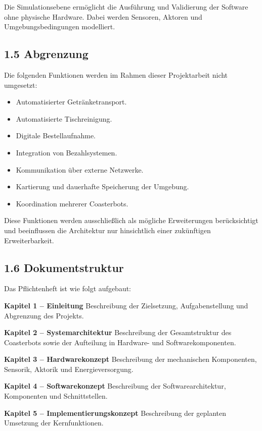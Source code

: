 \documentclass[
  a4paper,
  12pt,
  DIV=12,        %
  parskip=half,  %
  headings=small %
]{scrartcl}
\theoremstyle{definition}
\providecommand{\tightlist}{%
  \setlength{\itemsep}{0pt}\setlength{\parskip}{0pt}}
\theoremstyle{definition}
\providecommand{\tightlist}{%
  \setlength{\itemsep}{0pt}\setlength{\parskip}{0pt}}
\begin{document}
Die Simulationsebene ermöglicht die Ausführung und Validierung der
Software ohne physische Hardware. Dabei werden Sensoren, Aktoren und
Umgebungsbedingungen modelliert.

\subsection{1.5 Abgrenzung}\label{abgrenzung}

Die folgenden Funktionen werden im Rahmen dieser Projektarbeit nicht
umgesetzt:

\begin{itemize}
\tightlist
\item
  Automatisierter Getränketransport.
\item
  Automatisierte Tischreinigung.
\item
  Digitale Bestellaufnahme.
\item
  Integration von Bezahlsystemen.
\item
  Kommunikation über externe Netzwerke.
\item
  Kartierung und dauerhafte Speicherung der Umgebung.
\item
  Koordination mehrerer Coasterbots.
\end{itemize}

Diese Funktionen werden ausschließlich als mögliche Erweiterungen
berücksichtigt und beeinflussen die Architektur nur hinsichtlich einer
zukünftigen Erweiterbarkeit.

\subsection{1.6 Dokumentstruktur}\label{dokumentstruktur}

Das Pflichtenheft ist wie folgt aufgebaut:

\textbf{Kapitel 1 -- Einleitung} Beschreibung der Zielsetzung,
Aufgabenstellung und Abgrenzung des Projekts.

\textbf{Kapitel 2 -- Systemarchitektur} Beschreibung der Gesamtstruktur
des Coasterbots sowie der Aufteilung in Hardware- und
Softwarekomponenten.

\textbf{Kapitel 3 -- Hardwarekonzept} Beschreibung der mechanischen
Komponenten, Sensorik, Aktorik und Energieversorgung.

\textbf{Kapitel 4 -- Softwarekonzept} Beschreibung der
Softwarearchitektur, Komponenten und Schnittstellen.

\textbf{Kapitel 5 -- Implementierungskonzept} Beschreibung der geplanten
Umsetzung der Kernfunktionen.
\end{document}
